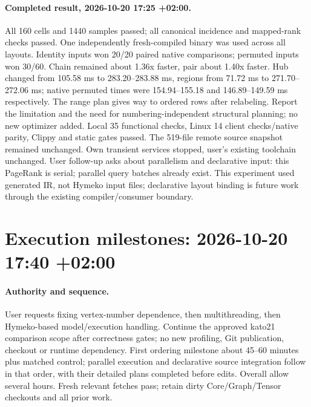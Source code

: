 \documentclass[11pt,a4paper]{article}
\begin{document}
\paragraph{Completed result, 2026-10-20 17:25 +02:00.}
All 160 cells and 1440 samples passed; all canonical incidence and mapped-rank
checks passed. One independently fresh-compiled binary was used across all layouts.
Identity inputs won 20/20 paired native comparisons; permuted inputs won 30/60.
Chain remained about 1.36x faster, pair about 1.40x faster. Hub changed from
105.58 ms to 283.20--283.88 ms, regions from 71.72 ms to 271.70--272.06 ms;
native permuted times were 154.94--155.18 and 146.89--149.59 ms respectively.
The range plan gives way to ordered rows after relabeling. Report the limitation
and the need for numbering-independent structural planning; no new optimizer added.
Local 35 functional checks, Linux 14 client checks/native parity, Clippy and static
gates passed. The 519-file remote source snapshot remained unchanged. Own transient
services stopped, user's existing toolchain unchanged. User follow-up asks about
parallelism and declarative input: this PageRank is serial; parallel query batches
already exist. This experiment used generated IR, not Hymeko input files; declarative
layout binding is future work through the existing compiler/consumer boundary.
\clearpage\section*{Execution milestones: 2026-10-20 17:40 +02:00}
\paragraph{Authority and sequence.} User requests fixing vertex-number dependence,
then multithreading, then Hymeko-based model/execution handling. Continue the approved
kato21 comparison scope after correctness gates; no new profiling, Git publication,
checkout or runtime dependency. First ordering milestone about 45--60 minutes plus
matched control; parallel execution and declarative source integration follow in that
order, with their detailed plans completed before edits. Overall allow several hours.
Fresh relevant fetches pass; retain dirty Core/Graph/Tensor checkouts and all prior work.
\end{document}
